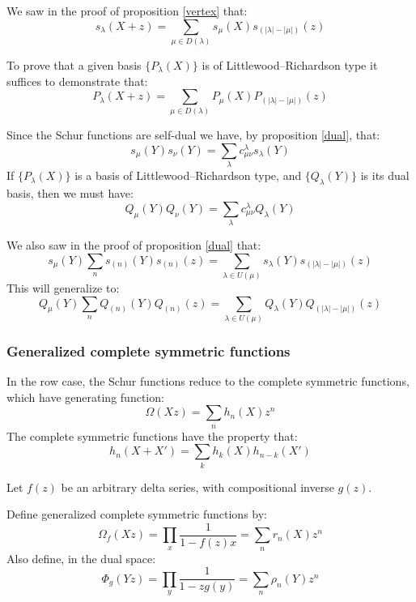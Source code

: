 \documentclass[12pt,dvips]{amsart}
\begin{document}
\par\bigskip
We saw in the proof of proposition \ref{vertex} that:
$$ s_\lambda(X + z) = \sum_{\mu \in D(\lambda)} s_\mu(X) s_{(|\lambda| - |\mu|)}(z) $$

To prove that a given basis $\{P_\lambda(X)\}$ is of Littlewood--Richardson type it suffices to demonstrate that:
$$ P_\lambda(X + z) = \sum_{\mu \in D(\lambda)} P_\mu(X) P_{(|\lambda| - |\mu|)}(z) $$

\par\bigskip
Since the Schur functions are self-dual we have, by proposition \ref{dual}, that:
$$ s_\mu(Y) s_\nu(Y) = \sum_{\lambda} c^{\lambda}_{\mu \nu} s_\lambda(Y)$$
If $\{P_\lambda(X)\}$ is a basis of Littlewood--Richardson type, and $\{Q_\lambda(Y)\}$ is its dual basis, then we must have:
$$ Q_\mu(Y) Q_\nu(Y) = \sum_{\lambda} c^{\lambda}_{\mu \nu} Q_\lambda(Y)$$



\par\bigskip
We also saw in the proof of proposition \ref{dual} that:
$$ s_\mu(Y) %
\sum_n s_{(n)}(Y) s_{(n)}(z) %
= \sum_{\lambda \in U(\mu)} s_\lambda(Y)s_{(|\lambda| - |\mu|)}(z) $$
This will generalize to:
$$ Q_\mu(Y) %
\sum_n Q_{(n)}(Y) Q_{(n)}(z)%
= \sum_{\lambda \in U(\mu)} Q_\lambda(Y)Q_{(|\lambda| - |\mu|)}(z) $$


\subsubsection{Generalized complete symmetric functions}
In the row case, the Schur functions reduce to the complete symmetric functions, which have generating function:
$$ \Omega(Xz) = \sum_n h_n(X) z^n $$
The complete symmetric functions have the property that:
$$ h_n(X + X') = \sum_k h_k(X) h_{n-k}(X') $$

\noindent
Let $f(z)$ be an arbitrary delta series, with compositional inverse $g(z)$. 

\par\bigskip
Define generalized complete symmetric functions by:
\begin{equation}
\Omega_{f}(Xz) = \prod_x \frac{1}{1-f(z)x} = \sum_n r_n(X) z^n 
\end{equation}
Also define, in the dual space:
\begin{equation}
\Phi_{g}(Yz) = \prod_y \frac{1}{1-zg(y)} = \sum_n \rho_n(Y) z^n 
\end{equation}
\end{document}
